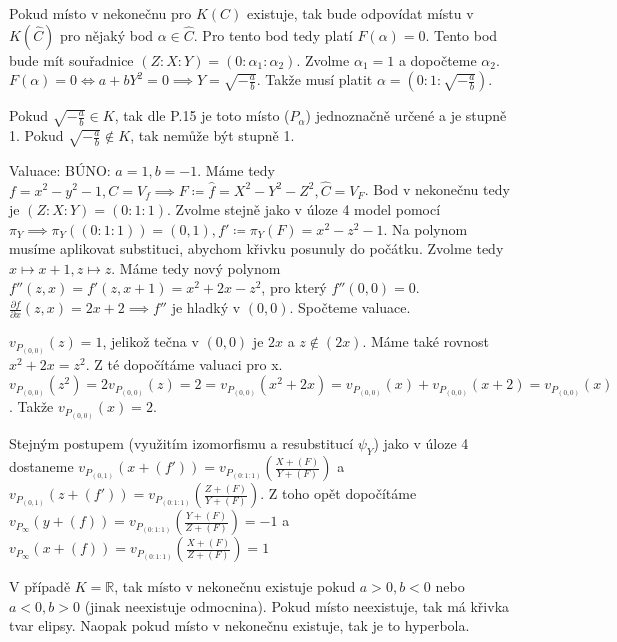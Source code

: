 \documentclass[12pt, a4paper]{article}
\begin{document}
Pokud místo v nekonečnu pro $K(C)$ existuje, tak bude odpovídat místu v $K(\hat{C})$ pro nějaký bod $\alpha \in \hat{C}$. Pro tento bod tedy platí $F(\alpha)=0$. Tento bod bude mít souřadnice $(Z:X:Y) = (0:\alpha_1:\alpha_2)$. Zvolme $\alpha_1 = 1$ a dopočteme $\alpha_2$. $F(\alpha)=0 \iff a + bY^2 = 0 \implies Y = \sqrt{-\frac{a}{b}}$. Takže musí platit $\alpha = (0:1:\sqrt{-\frac{a}{b}})$.

Pokud $\sqrt{-\frac{a}{b}} \in K$, tak dle P.15 je toto místo ($P_\alpha$) jednoznačně určené a je stupně 1. Pokud $\sqrt{-\frac{a}{b}} \notin K$, tak nemůže být stupně 1.

Valuace: BÚNO: $a=1, b=-1$. Máme tedy $f = x^2-y^2 - 1, C = V_f \implies F \coloneqq \hat{f} = X^2-Y^2-Z^2, \hat{C} = V_F$. Bod v nekonečnu tedy je $(Z:X:Y) = (0:1:1)$. Zvolme stejně jako v úloze 4 model pomocí $\pi_Y \implies \pi_Y((0:1:1)) = (0,1), f' \coloneqq \pi_Y(F) = x^2-z^2-1$. Na polynom musíme aplikovat substituci, abychom křivku posunuly do počátku. Zvolme tedy $x \mapsto x+1, z \mapsto z$. Máme tedy nový polynom $f''(z,x) = f'(z,x+1) = x^2+2x-z^2$, pro který $f''(0,0) = 0$. $\frac{\partial f}{\partial x}(z,x) = 2x + 2 \implies f''$ je hladký v $(0,0)$. Spočteme valuace. 

$v_{P_{(0,0)}}(z) = 1$, jelikož tečna v $(0,0)$ je $2x$ a $z \notin (2x)$. Máme také rovnost $x^2+2x=z^2$. Z té dopočítáme valuaci pro x. $v_{P_{(0,0)}}(z^2) = 2 v_{P_{(0,0)}}(z) = 2 = v_{P_{(0,0)}}(x^2+2x) = v_{P_{(0,0)}}(x) + v_{P_{(0,0)}}(x+2) = v_{P_{(0,0)}}(x)$. Takže $v_{P_{(0,0)}}(x) = 2$. 

Stejným postupem (využitím izomorfismu a resubstitucí $\psi_Y$) jako v úloze 4 dostaneme $v_{P_{(0,1)}}(x + (f')) = v_{P_{(0:1:1)}}(\frac{X + (F)}{Y+(F)})$ a  $v_{P_{(0,1)}}(z + (f')) = v_{P_{(0:1:1)}}(\frac{Z + (F)}{Y+(F)})$. Z toho opět dopočítáme  $v_{P_\infty}(y + (f)) = v_{P_{(0:1:1)}}(\frac{Y + (F)}{Z+(F)}) = -1$ a $v_{P_\infty}(x + (f)) = v_{P_{(0:1:1)}}(\frac{X + (F)}{Z+(F)}) = 1$

V případě $K = \mathbb{R}$, tak místo v nekonečnu existuje pokud $a > 0, b < 0$ nebo $a < 0, b > 0$ (jinak neexistuje odmocnina). Pokud místo neexistuje, tak má křivka tvar elipsy. Naopak pokud místo v nekonečnu existuje, tak je to hyperbola.
\end{document}
